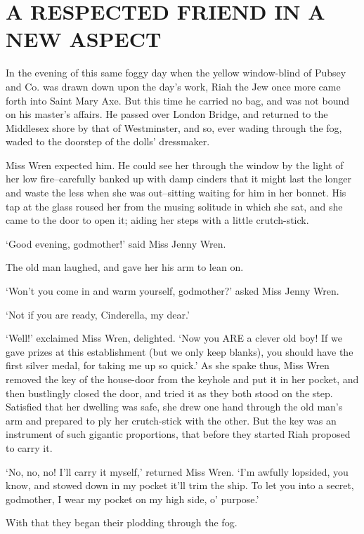 
\chapter{A RESPECTED FRIEND IN A NEW ASPECT}

In the evening of this same foggy day when the yellow window-blind of
Pubsey and Co. was drawn down upon the day’s work, Riah the Jew once
more came forth into Saint Mary Axe. But this time he carried no bag,
and was not bound on his master’s affairs. He passed over London Bridge,
and returned to the Middlesex shore by that of Westminster, and so, ever
wading through the fog, waded to the doorstep of the dolls’ dressmaker.

Miss Wren expected him. He could see her through the window by the light
of her low fire--carefully banked up with damp cinders that it might
last the longer and waste the less when she was out--sitting waiting
for him in her bonnet. His tap at the glass roused her from the musing
solitude in which she sat, and she came to the door to open it; aiding
her steps with a little crutch-stick.

‘Good evening, godmother!’ said Miss Jenny Wren.

The old man laughed, and gave her his arm to lean on.

‘Won’t you come in and warm yourself, godmother?’ asked Miss Jenny Wren.

‘Not if you are ready, Cinderella, my dear.’

‘Well!’ exclaimed Miss Wren, delighted. ‘Now you ARE a clever old boy!
If we gave prizes at this establishment (but we only keep blanks), you
should have the first silver medal, for taking me up so quick.’ As she
spake thus, Miss Wren removed the key of the house-door from the keyhole
and put it in her pocket, and then bustlingly closed the door, and tried
it as they both stood on the step. Satisfied that her dwelling was safe,
she drew one hand through the old man’s arm and prepared to ply her
crutch-stick with the other. But the key was an instrument of such
gigantic proportions, that before they started Riah proposed to carry
it.

‘No, no, no! I’ll carry it myself,’ returned Miss Wren. ‘I’m awfully
lopsided, you know, and stowed down in my pocket it’ll trim the ship. To
let you into a secret, godmother, I wear my pocket on my high side, o’
purpose.’

With that they began their plodding through the fog.

